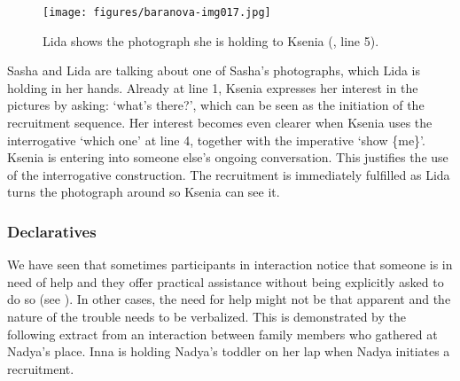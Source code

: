 \documentclass[output=paper,modfonts,nonflat]{langsci/langscibook}
\begin{document}
\begin{figure}
\texttt{[image: figures/baranova-img017.jpg]}
\caption{Lida shows the photograph she is holding to Ksenia (, line 5).}
\label{fig:baranova:17}
\end{figure}
\largerpage
Sasha and Lida are talking about one of Sasha’s photographs, which Lida is holding in her hands. Already at line 1, Ksenia expresses her interest in the pictures by asking: ‘what’s there?’, which can be seen as the initiation of the recruitment sequence. Her interest becomes even clearer when Ksenia uses the interrogative ‘which one’ at line 4, together with the imperative ‘show \{me\}’. Ksenia is entering into someone else’s ongoing conversation. This justifies the use of the interrogative construction. The recruitment is immediately fulfilled as Lida turns the photograph around so Ksenia can see it.

\subsubsection{Declaratives}\label{sec:baranova:3.3.3}

We have seen that sometimes participants in interaction notice that someone is in need of help and they offer practical assistance without being explicitly asked to do so (see ). In other cases, the need for help might not be that apparent and the nature of the trouble needs to be verbalized. This is demonstrated by the following extract from an interaction between family members who gathered at Nadya's place. Inna is holding Nadya's toddler on her lap when Nadya initiates a recruitment.
\end{document}
